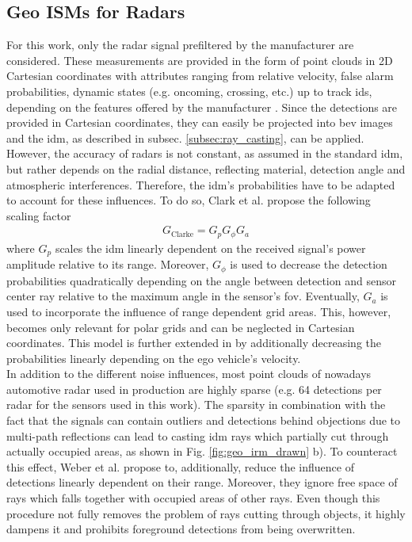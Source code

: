 \subsection{Geo ISMs for Radars}
\label{subsec:geo_ism_radar}
For this work, only the radar signal prefiltered by the manufacturer are considered. These measurements are provided in the form of point clouds in 2D Cartesian coordinates with attributes ranging from relative velocity, false alarm probabilities, dynamic states (e.g. oncoming, crossing, etc.) up to track ids, depending on the features offered by the manufacturer \cite{caesar2020nuscenes}. Since the detections are provided in Cartesian coordinates, they can easily be projected into \gls{bev} images and the \gls{idm}, as described in subsec. \ref{subsec:ray_casting}, can be applied.
\\
However, the accuracy of radars is not constant, as assumed in the standard \gls{idm}, but rather depends on the radial distance, reflecting material, detection angle and atmospheric interferences. Therefore, the \gls{idm}'s probabilities have to be adapted to account for these influences. To do so, Clark et al. \cite{clarke2012sensor} propose the following scaling factor
\begin{align}
	G_{\text{Clarke}} = G_p G_\phi G_a
\end{align}
where $G_p$ scales the \gls{idm} linearly dependent on the received signal's power amplitude relative to its range. Moreover, $G_\phi$ is used to decrease the detection probabilities quadratically depending on the angle between detection and sensor center ray relative to the maximum angle in the sensor's \gls{fov}. Eventually, $G_a$ is used to incorporate the influence of range dependent grid areas. This, however, becomes only relevant for polar grids and can be neglected in Cartesian coordinates. This model is further extended in \cite{prophet2018adaptions} by additionally decreasing the probabilities linearly depending on the ego vehicle's velocity.
\\
In addition to the different noise influences, most point clouds of nowadays automotive radar used in production are highly sparse (e.g. 64 detections per radar for the sensors used in this work). The sparsity in combination with the fact that the signals can contain outliers and detections behind objections due to multi-path reflections can lead to casting \gls{idm} rays which partially cut through actually occupied areas, as shown in Fig. \ref{fig:geo_irm_drawn} b). To counteract this effect, Weber et al. \cite{werber2015automotive} propose to, additionally, reduce the influence of detections linearly dependent on their range. Moreover, they ignore free space of rays which falls together with occupied areas of other rays. Even though this procedure not fully removes the problem of rays cutting through objects, it highly dampens it and prohibits foreground detections from being overwritten.
